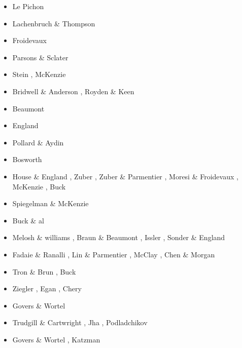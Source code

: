\begin{scriptsize}
\begin{itemize}
\item[\nineteensixtyeight] Le Pichon \cite{lepi68}
\item[\nineteenseventytwo] Lachenbruch \& Thompson \cite{lath72}
\item[\nineteenseventythree] Froidevaux \cite{froi73}
\item[\nineteenseventyseven] Parsons \& Sclater \cite{pasc77}
\item[\nineteenseventyeight] Stein \cite{stei78}, McKenzie \cite{mcke78}
\item[\nineteeneighty] Bridwell \& Anderson \cite{bran80}, Royden \& Keen \cite{roke80}
\item[\nineteeneightytwo] Beaumont \etal \cite{bekb82}
\item[\nineteeneightythree] England \cite{engl83}
\item[\nineteeneightyfour] Pollard \& Aydin \cite{poay84}
\item[\nineteeneightyfive] Bosworth \cite{bosw85}
\item[\nineteeneightysix] House \& England \cite{hoen86b}, Zuber \etal \cite{zupf86}, 
                          Zuber \& Parmentier \cite{zupa86}, Moresi \& Froidevaux \cite{mofr86},
                          McKenzie \cite{mcke86}, Buck \cite{buck86}
\item[\nineteeneightyseven] Spiegelman \& McKenzie \cite{spmc87}
\item[\nineteeneightyeight] Buck \& al \cite{bums88}
\item[\nineteeneightynine] Melosh \& williams \cite{mewi89}, Braun \& Beaumont \cite{brbe89,brbe89b,brbe89c},
                           Issler \etal \cite{ismb89}, Sonder \& England \cite{soen89}
\item[\nineteenninety] Fadaie \& Ranalli \cite{fara90}, Lin \& Parmentier \cite{lipa90},
                       McClay \cite{mccl90}, Chen \& Morgan \cite{chmo90,chmo90b}
\item[\nineteenninetyone] Tron \& Brun \cite{trbr91}, Buck \cite{buck91}
\item[\nineteenninetytwo] Ziegler \cite{zieg92b}, Egan \cite{egan92}, Chery \etal \cite{chld92}
\item[\nineteenninetythree] Govers \& Wortel \cite{gowo93}
\item[\nineteenninetyfour] Trudgill \& Cartwright \cite{trca94}, Jha \etal \cite{jhpp94},
                           Podladchikov \etal \cite{popy94}
\item[\nineteenninetyfive] Govers \& Wortel \cite{gowo95}, Katzman \etal \cite{katl95}

\end{itemize}
\end{scriptsize}
